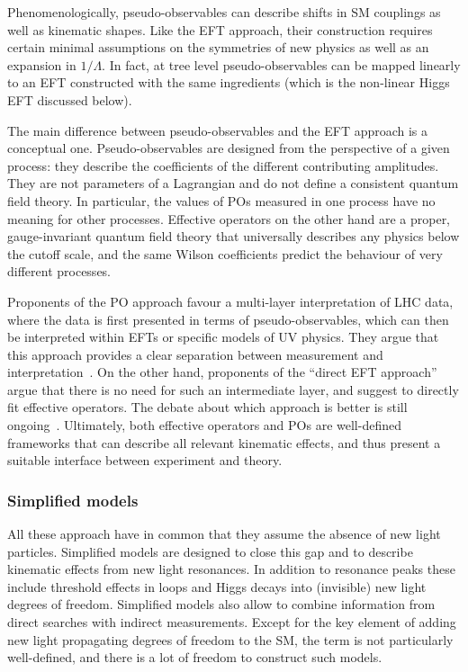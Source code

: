 Phenomenologically, pseudo-observables can describe shifts in SM
couplings as well as kinematic shapes. Like the EFT approach, their
construction requires certain minimal assumptions on the symmetries of
new physics as well as an expansion in $1/\Lambda$. In fact, at tree
level pseudo-observables can be mapped linearly to an EFT constructed
with the same ingredients (which is the non-linear Higgs EFT discussed
below).

The main difference between pseudo-observables and the EFT approach is
a conceptual one. Pseudo-observables are designed from the perspective
of a given process: they describe the coefficients of the different
contributing amplitudes. They are not parameters of a Lagrangian and
do not define a consistent quantum field theory. In particular, the
values of POs measured in one process have no meaning for other
processes. Effective operators on the other hand are a proper,
gauge-invariant quantum field theory that universally describes any
physics below the cutoff scale, and the same Wilson coefficients
predict the behaviour of very different processes.

Proponents of the PO approach favour a multi-layer interpretation of
LHC data, where the data is first presented in terms of
pseudo-observables, which can then be interpreted within EFTs or
specific models of UV physics. They argue that this approach provides
a clear separation between measurement and
interpretation~\cite{deFlorian:2016spz}. On the other hand, proponents
of the ``direct EFT approach'' argue that there is no need for such an
intermediate layer, and suggest to directly fit effective
operators. The debate about which approach is better is still
ongoing~\cite{deFlorian:2016spz}. Ultimately, both effective operators
and POs are well-defined frameworks that can describe all relevant
kinematic effects, and thus present a suitable interface between
experiment and theory.



\subsubsection{Simplified models}

All these approach have in common that they assume the absence of new
light particles. Simplified models are designed to close this gap and
to describe kinematic effects from new light resonances. In addition
to resonance peaks these include threshold effects in loops and Higgs
decays into (invisible) new light degrees of freedom. Simplified
models also allow to combine information from direct searches with
indirect measurements. Except for the key element of adding new light
propagating degrees of freedom to the SM, the term is not particularly
well-defined, and there is a lot of freedom to construct such models.

